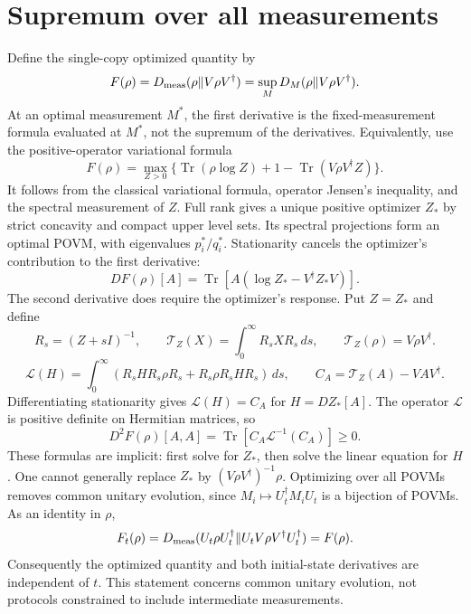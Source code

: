 \documentclass[11pt,a4paper]{article}
\newcommand{\Tr}{\operatorname{Tr}}
\begin{document}
\section{Supremum over all measurements}
Define the single-copy optimized quantity by
\[F(\rho)=D_{\rm meas}(\rho\Vert V\rho V^\dagger)=\sup_M D_M(\rho\Vert V\rho V^\dagger).\]
At an optimal measurement $M^*$, the first derivative is the fixed-measurement formula evaluated at $M^*$, not the supremum of the derivatives. Equivalently, use the positive-operator variational formula
\[F(\rho)=\max_{Z>0}\{\Tr(\rho\log Z)+1-\Tr(V\rho V^\dagger Z)\}.\]
It follows from the classical variational formula, operator Jensen's inequality, and the spectral measurement of $Z$. Full rank gives a unique positive optimizer $Z_*$ by strict concavity and compact upper level sets. Its spectral projections form an optimal POVM, with eigenvalues $p_i^*/q_i^*$.
Stationarity cancels the optimizer's contribution to the first derivative:
\[\boxed{DF(\rho)[A]=\Tr[A(\log Z_*-V^\dagger Z_*V)].}\]
The second derivative does require the optimizer's response. Put $Z=Z_*$ and define
\[R_s=(Z+sI)^{-1},\qquad\mathcal T_Z(X)=\int_0^\infty R_sXR_s\,ds,\qquad\mathcal T_Z(\rho)=V\rho V^\dagger.\]
\[\mathcal L(H)=\int_0^\infty(R_sHR_s\rho R_s+R_s\rho R_sHR_s)\,ds,\qquad C_A=\mathcal T_Z(A)-VAV^\dagger.\]
Differentiating stationarity gives $\mathcal L(H)=C_A$ for $H=DZ_*[A]$. The operator $\mathcal L$ is positive definite on Hermitian matrices, so
\[\boxed{D^2F(\rho)[A,A]=\Tr[C_A\mathcal L^{-1}(C_A)]\geq0.}\]
These formulas are implicit: first solve for $Z_*$, then solve the linear equation for $H$. One cannot generally replace $Z_*$ by $(V\rho V^\dagger)^{-1}\rho$.
Optimizing over all POVMs removes common unitary evolution, since $M_i\mapsto U_t^\dagger M_iU_t$ is a bijection of POVMs. As an identity in $\rho$,
\[F_t(\rho)=D_{\rm meas}(U_t\rho U_t^\dagger\Vert U_tV\rho V^\dagger U_t^\dagger)=F(\rho).\]
Consequently the optimized quantity and both initial-state derivatives are independent of $t$. This statement concerns common unitary evolution, not protocols constrained to include intermediate measurements.
\end{document}
